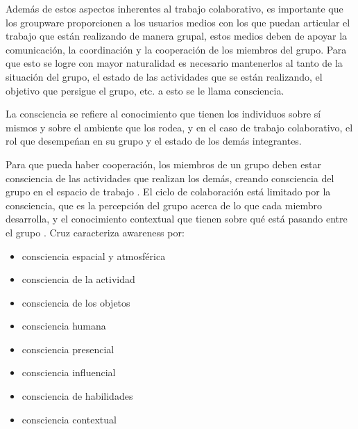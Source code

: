 Adem\'as de estos aspectos inherentes al trabajo colaborativo, es importante que los groupware proporcionen a los usuarios medios con los que puedan articular el trabajo que est\'an realizando de manera grupal, estos medios deben de apoyar la comunicaci\'on, la coordinaci\'on y la cooperaci\'on de los miembros del grupo. Para que esto se logre con mayor naturalidad es necesario mantenerlos al tanto de la situaci\'on del grupo, el estado de las actividades que se est\'an realizando, el objetivo que persigue el grupo, etc. a esto se le llama consciencia.

La consciencia se refiere al conocimiento que tienen los individuos sobre s\'i mismos y sobre el ambiente que los rodea, y en el caso de trabajo colaborativo, el rol que desempe\'nan en su grupo y el estado de los dem\'as integrantes.

Para que pueda haber cooperaci\'on, los miembros de un grupo deben estar consciencia de las actividades que realizan los dem\'as, creando consciencia del grupo en el espacio de trabajo \cite{cruz2012towards}. El ciclo de colaboraci\'on est\'a limitado por la consciencia, que es la percepci\'on del grupo acerca de lo que cada miembro desarrolla, y el conocimiento contextual que tienen sobre qu\'e est\'a pasando entre el grupo \cite{mittleman2008toward}. Cruz \cite{cruz2012towards} caracteriza awareness por:
\begin{itemize}
\item consciencia espacial y atmosf\'erica
\item consciencia de la actividad
\item consciencia de los objetos
\item consciencia humana
\item consciencia presencial
\item consciencia influencial
\item consciencia de habilidades
\item consciencia contextual
\end{itemize}

